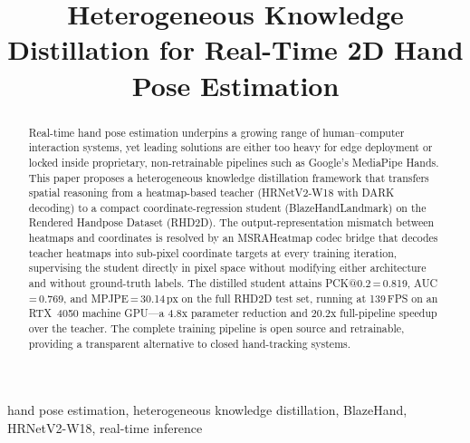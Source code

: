 \documentclass[11pt,conference,a4paper]{APSIPA2026}
\begin{document}
\title{Heterogeneous Knowledge Distillation for Real-Time 2D Hand Pose Estimation}

\author{
}

\maketitle
\thispagestyle{firststyle}
\pagestyle{empty}

\begin{abstract}
Real-time hand pose estimation underpins a growing range of
human--computer interaction systems, yet leading solutions are either
too heavy for edge deployment or locked inside proprietary,
non-retrainable pipelines such as Google's MediaPipe Hands. This paper
proposes a heterogeneous knowledge distillation framework that
transfers spatial reasoning from a heatmap-based teacher
(HRNetV2-W18 with DARK decoding) to a compact coordinate-regression
student (BlazeHandLandmark) on the Rendered Handpose Dataset (RHD2D).
The output-representation mismatch between heatmaps and coordinates is
resolved by an MSRAHeatmap codec bridge that decodes teacher heatmaps
into sub-pixel coordinate targets at every training iteration,
supervising the student directly in pixel space without modifying
either architecture and without ground-truth labels. The distilled
student attains PCK@0.2\,=\,0.819, AUC\,=\,0.769, and MPJPE\,=\,30.14\,px
on the full RHD2D test set, running at
139\,FPS on an RTX~4050 machine GPU---a 4.8x parameter reduction and
20.2x full-pipeline speedup over the teacher. The complete training
pipeline is open source and retrainable, providing a transparent
alternative to closed hand-tracking systems.
\end{abstract}

\begin{IEEEkeywords}
hand pose estimation, heterogeneous knowledge distillation,
BlazeHand, HRNetV2-W18, real-time inference
\end{IEEEkeywords}

\end{document}
